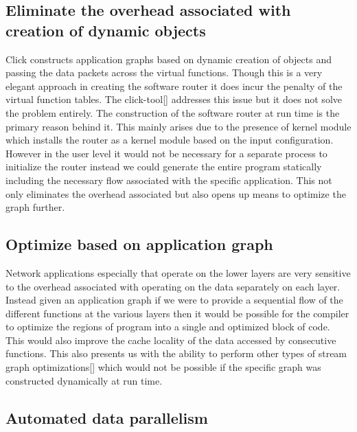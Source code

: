 \documentclass[prodmode,acmtaco]{acmsmall}
\begin{document}
\subsection{Eliminate the overhead associated with creation of dynamic objects}

Click constructs application graphs based on dynamic creation of objects and passing the data packets across the virtual functions. Though this is a very elegant approach in creating the software router it does incur the penalty of the virtual function tables. The click-tool[] addresses this issue but it does not solve the problem entirely. The construction of the software router at run time is the primary reason behind it. This mainly arises due to the presence of kernel module which installs the router as a kernel module based on the input configuration. However in the user level it would not be necessary for a separate process to initialize the router instead we could generate the entire program statically including the necessary flow associated with the specific application. This not only eliminates the overhead associated but also opens up means to optimize the graph further. 

\subsection{Optimize based on application graph}

Network applications especially that operate on the lower layers are very sensitive to the overhead associated with operating on the data separately on each layer. Instead given an application graph if we were to provide a sequential flow of the different functions at the various layers then it would be possible for the compiler to optimize the regions of program into a single and optimized block of code. This would also improve the cache locality of the data accessed by consecutive functions. This also presents us with the ability to perform other types of stream graph optimizations[] which would not be possible if the specific graph was constructed dynamically at run time.

\subsection{Automated data parallelism}
\end{document}

